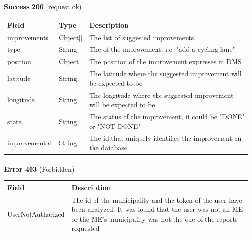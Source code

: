 						\paragraph{}
							\textbf{Success 200} (request ok)
							\begin{table}[!h]
								\begin{tabular}{L{0.25\textwidth}L{0.1\textwidth}L{0.45\textwidth}}
									\toprule
									Field & Type & Description \\
									\midrule
									improvements & Object[] & The list of suggested improvements \\
									\hspace{2.5mm}type & String & The of the improvement, i.e. "add a cycling lane" \\
									\hspace{2.5mm}position & Object & The position of the improvement expresses in DMS \\
									\hspace{5mm}latitude & String & The latitude where the suggested improvement will be expected to be \\
									\hspace{5mm}longitude & String & The longitude where the suggested improvement will be expected to be  \\
									\hspace{2.5mm}state & String & The status of the improvement, it could be "DONE" or "NOT DONE" \\
									\hspace{2.5mm}improvementId & String & The id that uniquely identifies the improvement on the database \\
								 	\bottomrule
								\end{tabular}
							\end{table}
						\paragraph{}
							\textbf{Error 403} (Forbidden)
							\begin{table}[!h]
								\begin{tabular}{L{0.4\textwidth}L{0.4\textwidth}}
									\toprule
									Field & Description \\
									\midrule
								  	UserNotAuthorized & The id of the municipality and the token of the user have been analyzed. It was found that the user was not an ME or the ME's  municipality was not the one of the reports requested  \\
								 	\bottomrule
								\end{tabular}
							\end{table}
